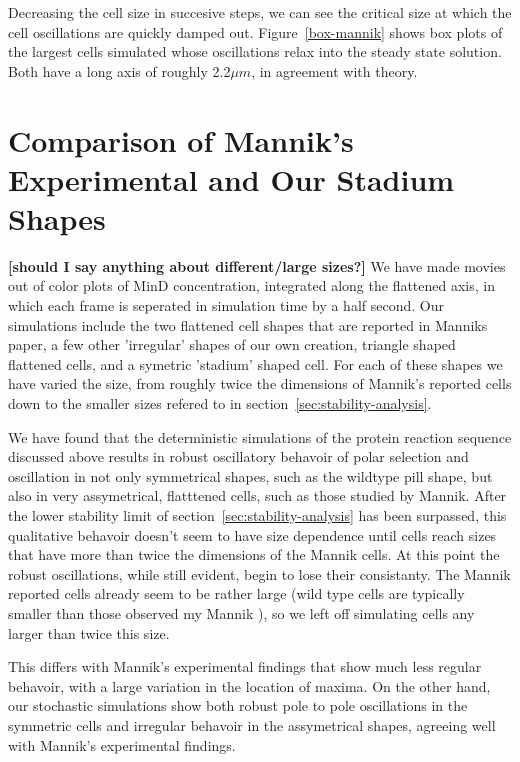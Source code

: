 \documentclass[letterpaper,twocolumn,amsmath,amssymb,pre]{revtex4-1}
\newcommand{\red}[1]{{\bf \color{red} #1}}
\newcommand{\fixme}[1]{\red{[#1]}}
\begin{document}
Decreasing the cell size in succesive steps, we can see the critical
size at which the cell oscillations are quickly damped out.
Figure~\ref{box-mannik} shows box plots of the largest cells simulated
whose oscillations relax into the steady state solution.  Both have a
long axis of roughly 2.2$\mu m$, in agreement with theory.

\section{Comparison of Mannik's Experimental and Our Stadium Shapes}
\fixme{should I say anything about different/large sizes?}  We have
made movies out of color plots of MinD concentration, integrated along
the flattened axis, in which each frame is seperated in simulation
time by a half second. Our simulations include the two flattened cell
shapes that are reported in Manniks paper, a few other 'irregular'
shapes of our own creation, triangle shaped flattened cells, and a
symetric 'stadium' shaped cell. For each of these shapes we have
varied the size, from roughly twice the dimensions of Mannik's
reported cells down to the smaller sizes refered to in
section~\ref{sec:stability-analysis}.

We have found that the deterministic simulations of the protein
reaction sequence discussed above results in robust oscillatory
behavoir of polar selection and oscillation in not only symmetrical
shapes, such as the wildtype pill shape, but also in very
assymetrical, flatttened cells, such as those studied by Mannik.
After the lower stability limit of
section~\ref{sec:stability-analysis} has been surpassed, this
qualitative behavoir doesn't seem to have size dependence until cells
reach sizes that have more than twice the dimensions of the Mannik
cells.  At this point the robust oscillations, while still evident,
begin to lose their consistanty.  The Mannik reported cells already
seem to be rather large (wild type cells are typically smaller than
those observed my Mannik
\cite{kubitschek1990cell,kubitschek1968linear,mannik2012robustness}),
so we left off simulating cells any larger than twice this size.

This differs with Mannik's experimental findings
that show much less regular behavoir, with a large variation in the
location of maxima.  On the other hand, our stochastic simulations
show both robust pole to pole oscillations in the symmetric cells and
irregular behavoir in the assymetrical shapes, agreeing well with
Mannik's experimental findings.
\end{document}
